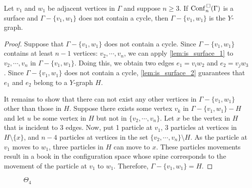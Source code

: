 \begin{lem}
\label{lem:is_surface_Y}
Let \(v_1\) and \(w_1\) be adjacent vertices in \(\Gamma\) and suppose \(n \ge 3\).
If \(\mathrm{Conf}^{\,\square}_n(\Gamma)\) is a surface and \(\Gamma - \{v_1, w_1\}\) does not contain a cycle, then \(\Gamma - \{v_1, w_1\}\) is the \(Y\)-graph.
\end{lem}
\begin{proof}
Suppose that \(\Gamma - \{v_1, w_1\}\) does not contain a cycle.
Since \(\Gamma - \{v_1, w_1\}\) contains at least \(n - 1\) vertices: \(v_2, \cdots, v_n\), 
we can apply \ref{lem:is_surface_1} to \(v_2, \cdots, v_n\) in \(\Gamma - \{v_1, w_1\}\).
Doing this, we obtain two edges \(e_1 = v_i w_2\) and \(e_2 = v_j w_3\).
Since \(\Gamma - \{v_1, w_1\}\) does not contain a cycle, \ref{lem:is_surface_2} guarantees that
\(e_1\) and \(e_2\) belong to a \(Y\)-graph \(H\).

It remains to show that there can not exist any other vertices in \(\Gamma - \{v_1, w_1\}\) other than those in \(H\).
Suppose there exists some vertex \(v_k\) in \(\Gamma - \{v_1, w_1\} - H\) and let \(u\) be some vertex in \(H\) but not in \(\{v_2, \cdots, v_n\}\).
Let \(x\) be the vertex in \(H\) that is incident to \(3\) edges.
Now, put 1 particle at \(v_1\), \(3\) particles at vertices in \(H \setminus \{x\}\),
and \(n-4\) particles at vertices in the set \(\{v_2, \cdots, v_n\}\setminus H\).
As the particle at \(v_1\) moves to \(w_1\),
three particles in \(H\) can move to \(x\).
These particles movements result in a book in the configuration space whose spine
corresponds to the movement of the particle at \(v_1\) to \(w_1\).
Therefore, \(\Gamma - \{v_1, w_1\} = H\).
\end{proof}


\begin{figure}
    \centering
{}
\caption{\(\Theta_4\)}
\label{fig:Theta_4}
\end{figure}

